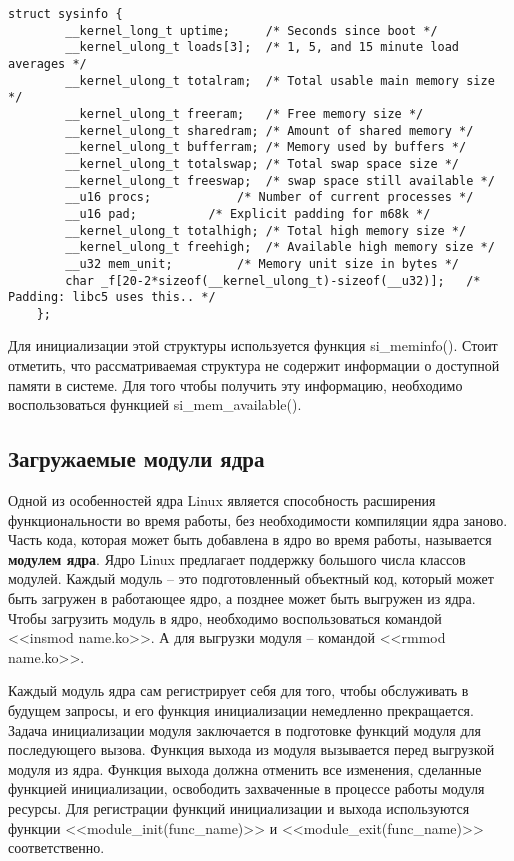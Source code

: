 \begin{lstlisting}[label={lst:sysinfo}, caption={структура struct sysinfo}]
	struct sysinfo {
		__kernel_long_t uptime;		/* Seconds since boot */
		__kernel_ulong_t loads[3];	/* 1, 5, and 15 minute load averages */
		__kernel_ulong_t totalram;	/* Total usable main memory size */
		__kernel_ulong_t freeram;	/* Free memory size */
		__kernel_ulong_t sharedram;	/* Amount of shared memory */
		__kernel_ulong_t bufferram;	/* Memory used by buffers */
		__kernel_ulong_t totalswap;	/* Total swap space size */
		__kernel_ulong_t freeswap;	/* swap space still available */
		__u16 procs;		   	/* Number of current processes */
		__u16 pad;		   	/* Explicit padding for m68k */
		__kernel_ulong_t totalhigh;	/* Total high memory size */
		__kernel_ulong_t freehigh;	/* Available high memory size */
		__u32 mem_unit;			/* Memory unit size in bytes */
		char _f[20-2*sizeof(__kernel_ulong_t)-sizeof(__u32)];	/* Padding: libc5 uses this.. */
	};
\end{lstlisting}

Для инициализации этой структуры используется функция si\_meminfo(). Стоит отметить, что рассматриваемая структура не содержит информации о доступной памяти в системе. Для того чтобы получить эту информацию, необходимо воспользоваться функцией si\_mem\_available().

\subsection{Загружаемые модули ядра}

Одной из особенностей ядра Linux является способность расширения функциональности во время работы, без необходимости компиляции ядра заново. Часть кода, которая может быть добавлена в ядро во время работы, называется \textbf{модулем ядра}. Ядро Linux предлагает поддержку большого числа классов модулей. Каждый модуль -- это подготовленный объектный код, который может быть загружен в работающее ядро, а позднее может быть выгружен из ядра. Чтобы загрузить модуль в ядро, необходимо воспользоваться командой <<insmod name.ko>>. А для выгрузки модуля -- командой <<rmmod name.ko>>.

Каждый модуль ядра сам регистрирует себя для того, чтобы обслуживать в будущем запросы, и его функция инициализации немедленно прекращается. Задача инициализации модуля заключается в подготовке функций модуля для последующего вызова. Функция выхода из модуля вызывается перед выгрузкой модуля из ядра. Функция выхода должна отменить все изменения, сделанные функцией инициализации, освободить захваченные в процессе работы модуля ресурсы. Для регистрации функций инициализации и выхода используются функции <<module\_init(func\_name)>> и <<module\_exit(func\_name)>> соответственно.

